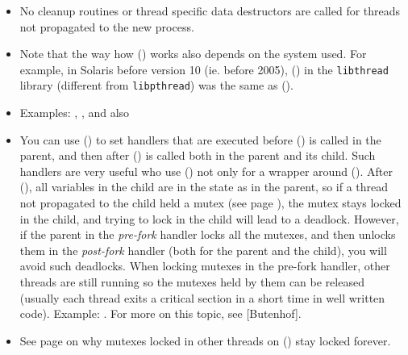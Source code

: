 \begin{itemize}
\item No cleanup routines or thread specific data destructors are called for
threads not propagated to the new process.
\item \label{FORKALL} Note that the way how () works also depends on
the system used.  For example, in Solaris before version 10 (ie. before 2005),
() in the \texttt{libthread} library (different from
\texttt{libpthread}) was the same as ().
\item Examples: ,
, and also 
\item \label{ATFORK} You can use () to set handlers that
are executed before () is called in the parent, and then after
() is called both in the parent and its child.  Such handlers are
very useful who use () not only for a wrapper around ().
After (), all variables in the child are in the state as in the
parent, so if a thread not propagated to the child held a mutex (see page
\pageref{MUTEXES}), the mutex stays
locked in the child, and trying to lock in the child will lead to a deadlock.
However, if the parent in the \emph{pre-fork} handler locks all the mutexes, and
then unlocks them in the \emph{post-fork} handler (both for the parent and the
child), you will avoid such deadlocks.  When locking mutexes in the
pre-fork handler, other threads are still running so the mutexes held by them
can be released (usually each thread exits a critical section in a short time
in well written code).  Example: .  For more on this
topic, see [Butenhof].
\item See page \pageref{MUTEXES} on why mutexes locked in other threads on
() stay locked forever.
\end{itemize}



